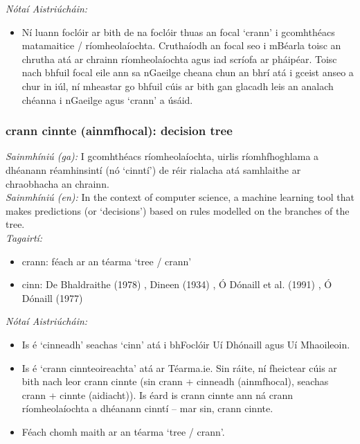 \noindent \textit{Nótaí Aistriúcháin:}
\begin{itemize}
	\item Ní luann foclóir ar bith de na foclóir thuas an focal `crann' i gcomhthéacs matamaitice / ríomheolaíochta. Cruthaíodh an focal seo i mBéarla toisc an chrutha atá ar chrainn ríomheolaíochta agus iad scríofa ar pháipéar. Toisc nach bhfuil focal eile ann sa nGaeilge cheana chun an bhrí atá i gceist anseo a chur in iúl, ní mheastar go bhfuil cúis ar bith gan glacadh leis an analach chéanna i nGaeilge agus `crann' a úsáid.
\end{itemize}


\subsubsection*{crann cinnte (ainmfhocal): decision tree}
 \noindent \textit{Sainmhíniú (ga):} I gcomhthéacs ríomheolaíochta, uirlis ríomhfhoghlama a dhéanann réamhinsintí (nó `cinntí') de réir rialacha atá samhlaithe ar chraobhacha an chrainn.
\\
 \noindent \textit{Sainmhíniú (en):} In the context of computer science, a machine learning tool that makes predictions (or `decisions') based on rules modelled on the branches of the tree.
\\
 \noindent \textit{Tagairtí:}
\begin{itemize}
	\item crann: féach ar an téarma `tree / crann'
	\item cinn: De Bhaldraithe (1978) \cite{de-bhaldraithe}, Dineen (1934) \cite{dineen}, Ó Dónaill et al. (1991) \cite{focloir-beag}, Ó Dónaill (1977) \cite{odonaill}
\end{itemize}

 \noindent \textit{Nótaí Aistriúcháin:}
\begin{itemize}
	\item Is é `cinneadh' seachas `cinn' atá i bhFoclóir Uí Dhónaill agus Uí Mhaoileoin.
	\item Is é `crann cinnteoireachta' atá ar Téarma.ie. Sin ráite, ní fheictear cúis ar bith nach leor crann cinnte (sin crann + cinneadh (ainmfhocal), seachas crann + cinnte (aidiacht)). Is éard is crann cinnte ann ná crann ríomheolaíochta a dhéanann cinntí -- mar sin, crann cinnte.
	\item Féach chomh maith ar an téarma `tree / crann'.
\end{itemize}


